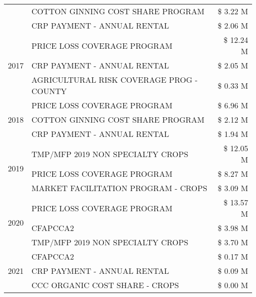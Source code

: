 \begin{tabular}{llr}
 & COTTON GINNING COST SHARE PROGRAM & \$ 3.22 M \\
 & CRP PAYMENT - ANNUAL RENTAL & \$ 2.06 M \\
\cline{1-3}
\multirow[t]{3}{*}{2017} & PRICE LOSS COVERAGE PROGRAM & \$ 12.24 M \\
 & CRP PAYMENT - ANNUAL RENTAL & \$ 2.05 M \\
 & AGRICULTURAL RISK COVERAGE PROG - COUNTY & \$ 0.33 M \\
\cline{1-3}
\multirow[t]{3}{*}{2018} & PRICE LOSS COVERAGE PROGRAM & \$ 6.96 M \\
 & COTTON GINNING COST SHARE PROGRAM & \$ 2.12 M \\
 & CRP PAYMENT - ANNUAL RENTAL & \$ 1.94 M \\
\cline{1-3}
\multirow[t]{3}{*}{2019} & TMP/MFP 2019 NON SPECIALTY CROPS & \$ 12.05 M \\
 & PRICE LOSS COVERAGE PROGRAM & \$ 8.27 M \\
 & MARKET FACILITATION PROGRAM - CROPS & \$ 3.09 M \\
\cline{1-3}
\multirow[t]{3}{*}{2020} & PRICE LOSS COVERAGE PROGRAM & \$ 13.57 M \\
 & CFAPCCA2 & \$ 3.98 M \\
 & TMP/MFP 2019 NON SPECIALTY CROPS & \$ 3.70 M \\
\cline{1-3}
\multirow[t]{3}{*}{2021} & CFAPCCA2 & \$ 0.17 M \\
 & CRP PAYMENT - ANNUAL RENTAL & \$ 0.09 M \\
 & CCC ORGANIC COST SHARE - CROPS & \$ 0.00 M \\
\cline{1-3}
\bottomrule
\end{tabular}
